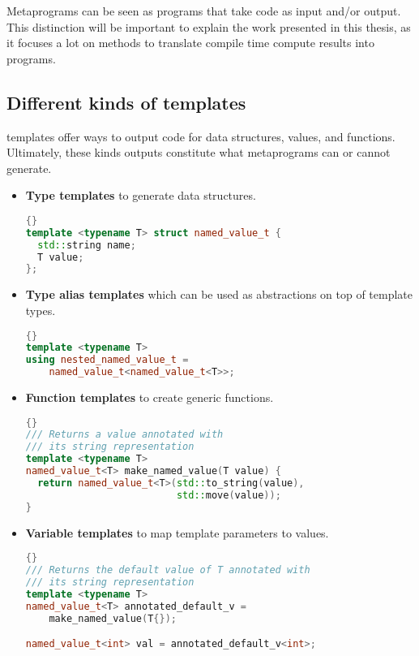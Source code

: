 \documentclass[../main]{subfiles}
\begin{document}
Metaprograms can be seen as programs that take code as input and/or output.
This distinction will be important to explain the work presented in
this thesis, as it focuses a lot on methods to translate
compile time compute results into \cpp programs.

\subsection{
  Different kinds of templates
}

\cpp templates offer ways to output code for data structures, values,
and functions. Ultimately, these kinds outputs constitute what metaprograms
can or cannot generate.

\begin{itemize}

  \item

\textbf{Type templates} to generate data structures.

\begin{lstlisting}[language=c++]{}
template <typename T> struct named_value_t {
  std::string name;
  T value;
};
\end{lstlisting}

  \item

\textbf{Type alias templates} which can be used as abstractions on top of
template types.

\begin{lstlisting}[language=c++]{}
template <typename T>
using nested_named_value_t =
    named_value_t<named_value_t<T>>;
\end{lstlisting}

  \item

\textbf{Function templates} to create generic functions.

\begin{lstlisting}[language=c++]{}
/// Returns a value annotated with
/// its string representation
template <typename T>
named_value_t<T> make_named_value(T value) {
  return named_value_t<T>(std::to_string(value),
                          std::move(value));
}
\end{lstlisting}

  \item

\textbf{Variable templates} to map template parameters to values.

\begin{lstlisting}[language=c++]{}
/// Returns the default value of T annotated with
/// its string representation
template <typename T>
named_value_t<T> annotated_default_v =
    make_named_value(T{});

named_value_t<int> val = annotated_default_v<int>;
\end{lstlisting}

\end{itemize}
\end{document}
